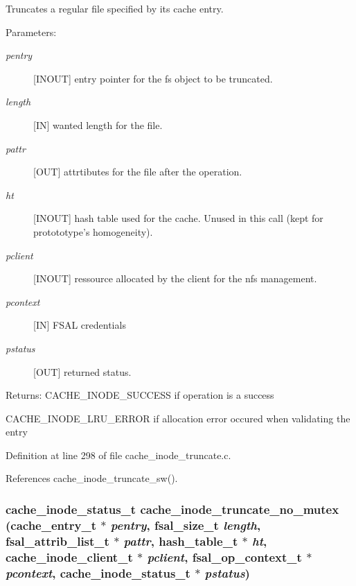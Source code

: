 Truncates a regular file specified by its cache entry.

\begin{Desc}
\item[Parameters:]
\begin{description}
\item[{\em pentry}][INOUT] entry pointer for the fs object to be truncated. \item[{\em length}][IN] wanted length for the file. \item[{\em pattr}][OUT] attrtibutes for the file after the operation. \item[{\em ht}][INOUT] hash table used for the cache. Unused in this call (kept for protototype's homogeneity). \item[{\em pclient}][INOUT] ressource allocated by the client for the nfs management. \item[{\em pcontext}][IN] FSAL credentials \item[{\em pstatus}][OUT] returned status.\end{description}
\end{Desc}
\begin{Desc}
\item[Returns:]CACHE\_\-INODE\_\-SUCCESS if operation is a success \par
 

CACHE\_\-INODE\_\-LRU\_\-ERROR if allocation error occured when validating the entry \end{Desc}


Definition at line 298 of file cache\_\-inode\_\-truncate.c.

References cache\_\-inode\_\-truncate\_\-sw().
\subsubsection{\setlength{\rightskip}{0pt plus 5cm}cache\_\-inode\_\-status\_\-t cache\_\-inode\_\-truncate\_\-no\_\-mutex (cache\_\-entry\_\-t $\ast$ {\em pentry}, fsal\_\-size\_\-t {\em length}, fsal\_\-attrib\_\-list\_\-t $\ast$ {\em pattr}, hash\_\-table\_\-t $\ast$ {\em ht}, cache\_\-inode\_\-client\_\-t $\ast$ {\em pclient}, fsal\_\-op\_\-context\_\-t $\ast$ {\em pcontext}, cache\_\-inode\_\-status\_\-t $\ast$ {\em pstatus})}\label{cache__inode__truncate_8c_a1}


